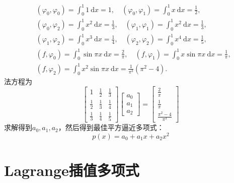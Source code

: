 \begin{solution}
    $$
        \begin{aligned}
             & \left(\varphi_0, \varphi_0\right)=\int_0^1 1 \mathrm{~d} x=1, \quad\left(\varphi_0, \varphi_1\right)=\int_0^1 x \mathrm{~d} x=\frac{1}{2},                   \\
             & \left(\varphi_0, \varphi_2\right)=\int_0^1 x^2 \mathrm{~d} x=\frac{1}{3}, \quad\left(\varphi_1, \varphi_1\right)=\int_0^1 x^2 \mathrm{~d} x=\frac{1}{3},     \\
             & \left(\varphi_1, \varphi_2\right)=\int_0^1 x^3 \mathrm{~d} x=\frac{1}{4}, \quad\left(\varphi_2, \varphi_2\right)=\int_0^1 x^4 \mathrm{~d} x=\frac{1}{5},     \\
             & \left(f, \varphi_0\right)=\int_0^1 \sin \pi x \mathrm{~d} x=\frac{2}{\pi}, \quad\left(f, \varphi_1\right)=\int_0^1 x \sin \pi x \mathrm{~d} x=\frac{1}{\pi}, \\
             & \left(f, \varphi_2\right)=\int_0^1 x^2 \sin \pi x \mathrm{~d} x=\frac{1}{\pi^3}\left(\pi^2-4\right) .
        \end{aligned}
    $$
    法方程为
    $$
        \left[\begin{array}{ccc}
                1           & \frac{1}{2} & \frac{1}{3} \\
                \frac{1}{2} & \frac{1}{3} & \frac{1}{4} \\
                \frac{1}{3} & \frac{1}{4} & \frac{1}{5}
            \end{array}\right]\left[\begin{array}{c}
                a_0 \\
                a_1 \\
                a_2
            \end{array}\right]=\left[\begin{array}{c}
                \frac{2}{\pi} \\
                \frac{1}{\pi} \\
                \frac{\pi^2-4}{\pi^3}
            \end{array}\right]
    $$
    求解得到$a_0,a_1,a_2$，然后得到最佳平方逼近多项式：
    \[
        p(x)=a_0+a_1x+a_2x^2
    \]
\end{solution}
\section{Lagrange插值多项式}

